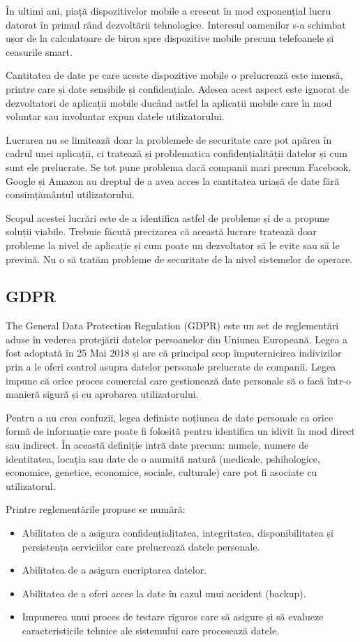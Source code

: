 \documentclass[12pt]{article}
\begin{document}
În ultimi ani, piață dispozitivelor mobile a crescut în mod exponențial lucru datorat în primul
rând dezvoltării tehnologice. Interesul oamenilor s-a schimbat ușor de la calculatoare de birou spre 
dispozitive mobile precum telefoanele și ceasurile smart. 

Cantitatea de date pe care aceste dispozitive mobile o prelucrează este imensă, printre care și date sensibile
și confidențiale. Adesea acest aspect este ignorat de dezvoltatori de aplicații mobile ducând astfel
la aplicații mobile care în mod voluntar sau involuntar expun datele utilizatorului. 

Lucrarea nu se limitează doar la problemele de securitate care pot apărea în cadrul unei aplicații, ci 
tratează și problematica confidențialității datelor și cum sunt ele prelucrate. Se tot pune problema dacă companii mari precum Facebook, Google și Amazon au dreptul de a avea acces la
cantitatea uriașă de date fără consimțământul utilizatorului.

Scopul acestei lucrări este de a identifica astfel de probleme și de a propune soluții viabile.
Trebuie făcută precizarea că această lucrare tratează doar probleme la nivel de aplicație și cum poate
un dezvoltator să le evite sau să le prevină. Nu o să tratăm probleme de securitate de la nivel sistemelor
de operare.

\newpage
\subsection{GDPR}

The General Data Protection Regulation (GDPR) este un set de reglementări aduse în vederea protejării datelor
persoanelor din Uniunea Europeană. Legea a fost adoptată în 25 Mai 2018 și are că principal scop împuternicirea
indivizilor prin a le oferi control asupra datelor personale prelucrate de companii. Legea impune că 
orice proces comercial care gestionează date personale să o facă într-o manieră sigură și cu aprobarea
utilizatorului.

Pentru a nu crea confuzii, legea definiste noțiunea de date personale ca orice formă de informație
care poate fi folosită pentru identifica un idivit în mod direct sau indirect. În această definiție intră
date precum: numele, numere de identitatea, locația sau date de o anumită natură (medicale, pshihologice, 
economice, genetice, economice, sociale, culturale) care pot fi asociate cu utilizatorul.

Printre reglementările propuse se numără:
\begin{itemize}
    \item Abilitatea de a asigura confidențialitatea, integritatea, disponibilitatea și persistența
    serviciilor care prelucrează datele personale.
    \item Abilitatea de a asigura encriptarea datelor.
    \item Abilitatea de a oferi acces la date în cazul unui accident (backup).
    \item Impunerea unui proces de testare riguros care să asigure și să evalueze caracteristicile
    tehnice ale sistemului care procesează datele.
\end{itemize}
\end{document}
